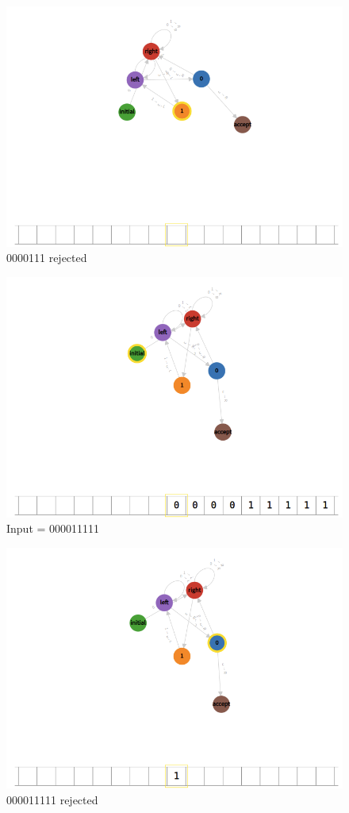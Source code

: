 \documentclass[12pt]{article}
\begin{document}
\begin{figure}[H]
    \caption{0000111 rejected}
    \centering
    \includegraphics[width=12cm]{Q1/0000111o.png}    
\end{figure}
\begin{figure}[H]
    \caption{Input = 000011111}
    \centering
    \includegraphics[width=12cm]{Q1/000011111.png}  
\end{figure}
\begin{figure}[H]
    \caption{000011111 rejected}
    \centering
    \includegraphics[width=12cm]{Q1/000011111o.png}  
\end{figure}
\end{document}
